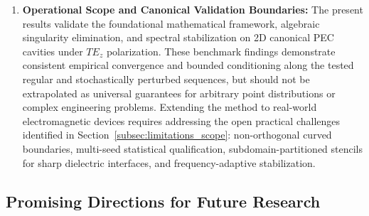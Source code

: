 \documentclass[preprint,12pt]{elsarticle}
\begin{document}
\begin{enumerate}
    \item \textbf{Operational Scope and Canonical Validation Boundaries:}
          The present results validate the foundational mathematical framework, algebraic singularity elimination, and spectral stabilization on 2D canonical PEC cavities under $TE_z$ polarization. These benchmark findings demonstrate consistent empirical convergence and bounded conditioning along the tested regular and stochastically perturbed sequences, but should not be extrapolated as universal guarantees for arbitrary point distributions or complex engineering problems. Extending the method to real-world electromagnetic devices requires addressing the open practical challenges identified in Section~\ref{subsec:limitations_scope}: non-orthogonal curved boundaries, multi-seed statistical qualification, subdomain-partitioned stencils for sharp dielectric interfaces, and frequency-adaptive stabilization.
\end{enumerate}

\subsection{Promising Directions for Future Research}
\label{subsec:future_works}
\end{document}
